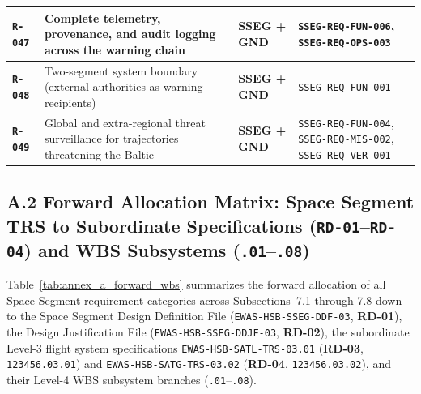 {\begin{longtable}{|>{\raggedright\arraybackslash}p{}|>{\raggedright\arraybackslash}p{}|>{\raggedright\arraybackslash}p{}|>{\raggedright\arraybackslash}p{}|}
\textbf{\texttt{R-047}} & Complete telemetry, provenance, and audit logging across the warning chain & \textbf{SSEG + GND} & \texttt{SSEG-REQ-FUN-006}, \texttt{SSEG-REQ-OPS-003} \\ \hline
\textbf{\texttt{R-048}} & Two-segment system boundary (external authorities as warning recipients) & \textbf{SSEG + GND} & \texttt{SSEG-REQ-FUN-001} \\ \hline
\textbf{\texttt{R-049}} & Global and extra-regional threat surveillance for trajectories threatening the Baltic & \textbf{SSEG + GND} & \texttt{SSEG-REQ-FUN-004}, \texttt{SSEG-REQ-MIS-002}, \texttt{SSEG-REQ-VER-001} \\ \hline
\end{longtable}}

\subsection{A.2 Forward Allocation Matrix: Space Segment TRS to Subordinate Specifications (\texttt{RD-01}--\texttt{RD-04}) and WBS Subsystems (\texttt{.01}--\texttt{.08})}

Table~\ref{tab:annex_a_forward_wbs} summarizes the forward allocation of all Space Segment requirement categories across Subsections~7.1 through 7.8 down to the Space Segment Design Definition File (\texttt{EWAS-HSB-SSEG-DDF-03}, \textbf{RD-01}), the Design Justification File (\texttt{EWAS-HSB-SSEG-DDJF-03}, \textbf{RD-02}), the subordinate Level-3 flight system specifications \texttt{EWAS-HSB-SATL-TRS-03.01} (\textbf{RD-03}, \texttt{123456.03.01}) and \texttt{EWAS-HSB-SATG-TRS-03.02} (\textbf{RD-04}, \texttt{123456.03.02}), and their Level-4 WBS subsystem branches (\texttt{.01}--\texttt{.08}).

